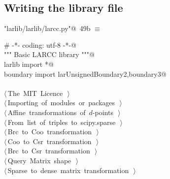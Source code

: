 \documentclass[11pt,oneside]{article}    %
\begin{document}
\subsection{Writing the library file}

\begin{flushleft} \small \label{scrap81}
\protect{}\verb@"larlib/larlib/larcc.py"@\nobreak\ {\footnotesize 49b }$\equiv$
\vspace{-1ex}
\begin{list}{}{} \item
\mbox{}\verb@# -*- coding: utf-8 -*-@\\
\mbox{}\verb@""" Basic LARCC library """@\\
\mbox{}\verb@from larlib import *@\\
\mbox{}\verb@from boundary import larUnsignedBoundary2,boundary3@\\
\mbox{}\verb@@\\
\mbox{}\verb@@\hbox{$\langle\,$The MIT Licence\nobreak\ {\footnotesize {}}$\,\rangle$}\verb@@\\
\mbox{}\verb@@\hbox{$\langle\,$Importing of modules or packages\nobreak\ {\footnotesize {}}$\,\rangle$}\verb@@\\
\mbox{}\verb@@\hbox{$\langle\,$Affine transformations of $d$-points\nobreak\ {\footnotesize {}}$\,\rangle$}\verb@@\\
\mbox{}\verb@@\hbox{$\langle\,$From list of triples to scipy.sparse\nobreak\ {\footnotesize {}}$\,\rangle$}\verb@@\\
\mbox{}\verb@@\hbox{$\langle\,$Brc to Coo transformation\nobreak\ {\footnotesize {}}$\,\rangle$}\verb@@\\
\mbox{}\verb@@\hbox{$\langle\,$Coo to Csr transformation\nobreak\ {\footnotesize {}}$\,\rangle$}\verb@@\\
\mbox{}\verb@@\hbox{$\langle\,$Brc to Csr transformation\nobreak\ {\footnotesize {}}$\,\rangle$}\verb@@\\
\mbox{}\verb@@\hbox{$\langle\,$Query Matrix shape\nobreak\ {\footnotesize {}}$\,\rangle$}\verb@@\\
\mbox{}\verb@@\hbox{$\langle\,$Sparse to dense matrix transformation\nobreak\ {\footnotesize {}}$\,\rangle$}\verb@@\\

\end{list}
\end{flushleft}
\end{document}
